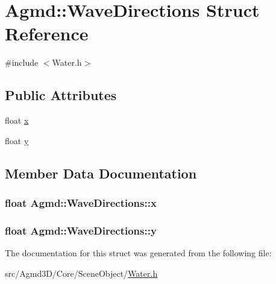 \hypertarget{struct_agmd_1_1_wave_directions}{\section{Agmd\+:\+:Wave\+Directions Struct Reference}
\label{struct_agmd_1_1_wave_directions}
}


{\ttfamily \#include $<$Water.\+h$>$}

\subsection*{Public Attributes}
\begin{DoxyCompactItemize}
\item 
float \hyperlink{struct_agmd_1_1_wave_directions_a035dc81113fe8112c6fd71df4b25f1c9}{x}
\item 
float \hyperlink{struct_agmd_1_1_wave_directions_a8691b53a64bdee86bf8925f284720eab}{y}
\end{DoxyCompactItemize}


\subsection{Member Data Documentation}
\hypertarget{struct_agmd_1_1_wave_directions_a035dc81113fe8112c6fd71df4b25f1c9}{
\subsubsection[{x}]{\setlength{\rightskip}{0pt plus 5cm}float Agmd\+::\+Wave\+Directions\+::x}}\label{struct_agmd_1_1_wave_directions_a035dc81113fe8112c6fd71df4b25f1c9}
\hypertarget{struct_agmd_1_1_wave_directions_a8691b53a64bdee86bf8925f284720eab}{
\subsubsection[{y}]{\setlength{\rightskip}{0pt plus 5cm}float Agmd\+::\+Wave\+Directions\+::y}}\label{struct_agmd_1_1_wave_directions_a8691b53a64bdee86bf8925f284720eab}


The documentation for this struct was generated from the following file\+:\begin{DoxyCompactItemize}
\item 
src/\+Agmd3\+D/\+Core/\+Scene\+Object/\hyperlink{_water_8h}{Water.\+h}\end{DoxyCompactItemize}
